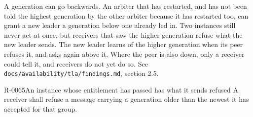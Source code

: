 \begin{gap}{}
  A generation can go backwards. An arbiter that has restarted, and has not been
  told the highest generation by the other arbiter because it has restarted too,
  can grant a new leader a generation below one already led in. Two instances
  still never act at once, but receivers that saw the higher generation refuse
  what the new leader sends. The new leader learns of the higher generation when
  its peer refuses it, and asks again above it. Where the peer is also down, only
  a receiver could tell it, and receivers do not yet do so. See
  \texttt{docs/availability/tla/findings.md}, section 2.5.
\end{gap}

\begin{requirement}{R-0065}{An instance whose entitlement has passed has what it sends refused}
  A receiver shall refuse a message carrying a generation older than the newest
  it has accepted for that group.
\end{requirement}
